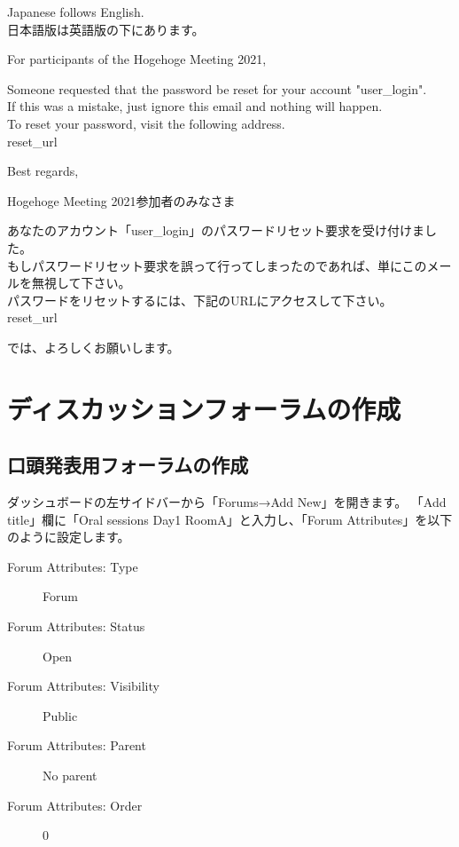 \documentclass[titlepage,10pt,a4paper,uplatex]{jsbook}
\newenvironment{content}{\begin{shaded}\vspace{-1em}\raggedright\ttfamily\footnotesize\setlength{\baselineskip}{1.4em}}{\end{shaded}\vspace{-1em}}
\begin{document}
\begin{content}
Japanese follows English.\\
日本語版は英語版の下にあります。

For participants of the Hogehoge Meeting 2021,

Someone requested that the password be reset for your account "{\lbrack}user\_login{\rbrack}".\\
If this was a mistake, just ignore this email and nothing will happen.\\
To reset your password, visit the following address.\\
{\lbrack}reset\_url{\rbrack}

Best regards,

Hogehoge Meeting 2021参加者のみなさま

あなたのアカウント「{\lbrack}user\_login{\rbrack}」のパスワードリセット要求を受け付けました。\\
もしパスワードリセット要求を誤って行ってしまったのであれば、単にこのメールを無視して下さい。\\
パスワードをリセットするには、下記のURLにアクセスして下さい。\\
{\lbrack}reset\_url{\rbrack}

では、よろしくお願いします。
\end{content}

\section{ディスカッションフォーラムの作成}

\subsection{口頭発表用フォーラムの作成}

ダッシュボードの左サイドバーから「Forums→Add New」を開きます。
「Add title」欄に「Oral sessions Day1 RoomA」と入力し、「Forum Attributes」を以下のように設定します。

\begin{description}
\item[Forum Attributes: Type] Forum
\item[Forum Attributes: Status] Open
\item[Forum Attributes: Visibility] Public
\item[Forum Attributes: Parent] No parent
\item[Forum Attributes: Order] 0
\end{description}
\end{document}
